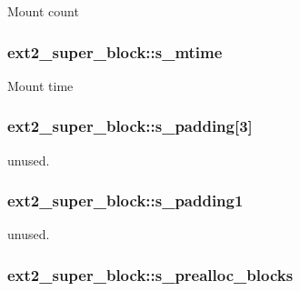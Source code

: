 \-Mount count \hypertarget{structext2__super__block_a3966a51d4e26f1b0280798db227b9720}{
\subsubsection[{s\-\_\-mtime}]{ {\bf ext2\-\_\-super\-\_\-block\-::s\-\_\-mtime}}}\label{structext2__super__block_a3966a51d4e26f1b0280798db227b9720}
\-Mount time \hypertarget{structext2__super__block_a81b4e1959f344b5b7445044806d27807}{
\subsubsection[{s\-\_\-padding}]{ {\bf ext2\-\_\-super\-\_\-block\-::s\-\_\-padding}\mbox{[}3\mbox{]}}}\label{structext2__super__block_a81b4e1959f344b5b7445044806d27807}
unused. \hypertarget{structext2__super__block_a1b0760049d39f6cfb1b26af0a01f64d2}{
\subsubsection[{s\-\_\-padding1}]{ {\bf ext2\-\_\-super\-\_\-block\-::s\-\_\-padding1}}}\label{structext2__super__block_a1b0760049d39f6cfb1b26af0a01f64d2}
unused. \hypertarget{structext2__super__block_a352689df3b3cb2a357bde6645e3c7f29}{
\subsubsection[{s\-\_\-prealloc\-\_\-blocks}]{ {\bf ext2\-\_\-super\-\_\-block\-::s\-\_\-prealloc\-\_\-blocks}}}\label{structext2__super__block_a352689df3b3cb2a357bde6645e3c7f29}
